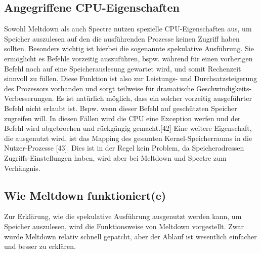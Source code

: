 \documentclass[conference,10pt,a4paper,twocolumn]{IEEEtran}
\begin{document}
\subsection{Angegriffene CPU-Eigenschaften}
Sowohl Meltdown als auch Spectre nutzen spezielle CPU-Eigenschaften aus, um Speicher auszulesen auf den die ausführenden Prozesse keinen Zugriff haben sollten. Besonders wichtig ist hierbei die sogenannte spekulative Ausführung. Sie ermöglicht es Befehle vorzeitig auszuführen, bspw. während für einen vorherigen Befehl noch auf eine Speicherauslesung gewartet wird, und somit Rechenzeit sinnvoll zu füllen. Diese Funktion ist also zur Leistungs- und Durchsatzsteigerung des Prozessors vorhanden und sorgt teilweise für dramatische Geschwindigkeits-Verbesserungen. Es ist natürlich möglich, dass ein solcher vorzeitig ausgeführter Befehl nicht erlaubt ist. Bspw. wenn dieser Befehl auf geschützten Speicher zugreifen will. In diesen Fällen wird die CPU eine Exception werfen und der Befehl wird abgebrochen und rückgängig gemacht.[42]\linebreak
Eine weitere Eigenschaft, die ausgenutzt wird, ist das Mapping des gesamten Kernel-Speicherraums in die Nutzer-Prozesse [43]. Dies ist in der Regel kein Problem, da Speicheradressen Zugriffs-Einstellungen haben, wird aber bei Meltdown und Spectre zum Verhängnis.

\subsection{Wie Meltdown funktioniert(e)}
Zur Erklärung, wie die spekulative Ausführung ausgenutzt werden kann, um Speicher auszulesen, wird die Funktionsweise von Meltdown vorgestellt. Zwar wurde Meltdown relativ schnell gepatcht, aber der Ablauf ist wesentlich einfacher und besser zu erklären. \linebreak
\begin{table}[h!]
\centering
\caption{Verwendete Register}

\end{table}
\end{document}
